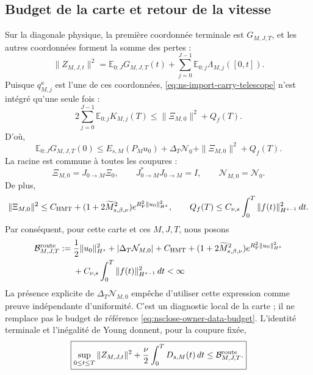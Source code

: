 \subsection{Budget de la carte et retour de la vitesse}

Sur la diagonale physique, la première coordonnée terminale est \(G_{M,J,T}\), et les autres coordonnées forment la somme des pertes :
\begin{equation}
 \|Z_{M,J,t}\|^2
 =\mathbb E_{0:J}G_{M,J,T}(t)
 +\sum_{j=0}^{J-1}\mathbb E_{0:j}\Lambda_{M,j}([0,t]).
 \label{eq:ns-import-ledger}
\end{equation}
Puisque \(q_{M,j}^{\kappa}\) est l'une de ces coordonnées, \eqref{eq:ns-import-carry-telescope} n'est intégré qu'une seule fois :
\begin{equation}
 2\sum_{j=0}^{J-1}\mathbb E_{0:j}K_{M,j}(T)
 \le\|\Xi_{M,0}\|^2+Q_f(T).
 \label{eq:ns-import-carry-funded}
\end{equation}
D'où,
\begin{equation}
 \mathbb E_{0:J}G_{M,J,T}(0)
 \le E_{s,M}(P_Mu_0)
 +\Delta_T\mathcal N_0+\|\Xi_{M,0}\|^2+Q_f(T).
 \label{eq:ns-import-root-bound}
\end{equation}
La racine est commune à toutes les coupures :
\begin{equation}
 \Xi_{M,0}=J_{0\to M}\Xi_0,
 \qquad J_{0\to M}^*J_{0\to M}=I,
 \qquad \mathcal N_{M,0}=\mathcal N_0.
 \label{eq:ns-import-common-root}
\end{equation}
De plus,
\begin{equation}
 \|\Xi_{M,0}\|^2
 \le C_{\rm HMT}
 +(1+2\widetilde M_{s,\beta,\nu}^2)
 e^{R_{\rm F}^2\|u_0\|_{H^s}^2},
 \qquad
 Q_f(T)\le C_{\nu,s}\int_0^T\|f(t)\|_{H^{s-1}}^2\,dt.
 \label{eq:ns-import-root-data-bound}
\end{equation}
Par conséquent, pour cette carte et ces \(M,J,T\), nous posons
\begin{align}
 \mathcal B_{M,J,T}^{\rm route}:={}&
 \frac12\|u_0\|_{H^s}^2
 +|\Delta_T\mathcal N_{M,0}|+C_{\rm HMT}
 +(1+2\widetilde M_{s,\beta,\nu}^2)
 e^{R_{\rm F}^2\|u_0\|_{H^s}^2}\notag\\
 &+C_{\nu,s}\int_0^T\|f(t)\|_{H^{s-1}}^2\,dt
 <\infty
 \label{eq:ns-import-explicit-budget}
\end{align}
La présence explicite de \(\Delta_T\mathcal N_{M,0}\) empêche d'utiliser cette expression comme preuve indépendante d'uniformité. C'est un diagnostic local de la carte ; il ne remplace pas le budget de référence \eqref{eq:nsclose-owner-data-budget}. L'identité terminale et l'inégalité de Young donnent, pour la coupure fixée,
\begin{equation}
 \boxed{
 \sup_{0\le t\le T}\|Z_{M,J,t}\|^2
 +\frac{\nu}{2}\int_0^TD_{s,M}(t)\,dt
 \le\mathcal B_{M,J,T}^{\rm route}.}
 \label{eq:ns-import-uniform-budget}
\end{equation}

